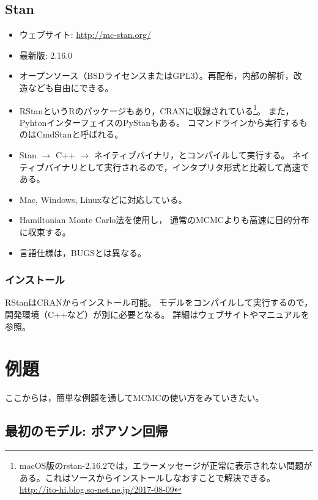 \documentclass[11pt,uplatex]{jsarticle}
\begin{document}
\subsection{Stan}
\label{Stan}
\begin{itemize}

\item ウェブサイト:
  \url{http://mc-stan.org/}

\item 最新版: 2.16.0
\item オープンソース（BSDライセンスまたはGPL3）。再配布，内部の解析，改
  造なども自由にできる。
\item \textsf{RStan}という\textsf{R}のパッケージもあり，CRANに収録されている\footnote{macOS版のrstan-2.16.2では，エラーメッセージが正常に表示されない問題がある。これはソースからインストールしなおすことで解決できる。\url{http://ito-hi.blog.so-net.ne.jp/2017-08-09}}。
また，Pyhtonインターフェイスの\textsf{PyStan}もある。
コマンドラインから実行するものは\textsf{CmdStan}と呼ばれる。
\item Stan $\rightarrow$ C++ $\rightarrow$ ネイティブバイナリ，とコンパイルして実行する。
ネイティブバイナリとして実行されるので，インタプリタ形式と比較して高速である。
\item Mac, Windows, Linuxなどに対応している。
\item Hamiltonian Monte Carlo法\cite{PRML, BDA3, Toyoda2015}を使用し，
通常のMCMCよりも高速に目的分布に収束する。
\item 言語仕様は，BUGSとは異なる。
\end{itemize}

\subsubsection*{インストール}
RStanはCRANからインストール可能。
モデルをコンパイルして実行するので，開発環境（C++など）が別に必要となる。
詳細はウェブサイトやマニュアルを参照。



\section{例題}

ここからは，簡単な例題を通してMCMCの使い方をみていきたい。

\subsection{最初のモデル: ポアソン回帰}
\end{document}

